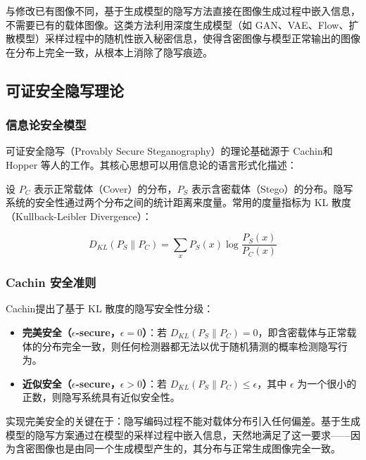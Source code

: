 与修改已有图像不同，基于生成模型的隐写方法直接在图像生成过程中嵌入信息，不需要已有的载体图像。这类方法利用深度生成模型（如 GAN、VAE、Flow、扩散模型）采样过程中的随机性嵌入秘密信息，使得含密图像与模型正常输出的图像在分布上完全一致，从根本上消除了隐写痕迹\supercite{de2022perfectly}。

\subsection{可证安全隐写理论}

\subsubsection{信息论安全模型}

可证安全隐写（Provably Secure Steganography）的理论基础源于 Cachin\supercite{cachin2004information}和 Hopper 等人\supercite{hopper2009provably}的工作。其核心思想可以用信息论的语言形式化描述：

设 $P_C$ 表示正常载体（Cover）的分布，$P_S$ 表示含密载体（Stego）的分布。隐写系统的安全性通过两个分布之间的统计距离来度量。常用的度量指标为 KL 散度（Kullback-Leibler Divergence）：

\begin{equation}\label{eq:kl}
    D_{KL}(P_S \| P_C) = \sum_{x} P_S(x) \log \frac{P_S(x)}{P_C(x)}
\end{equation}

\subsubsection{Cachin 安全准则}

Cachin\supercite{cachin2004information}提出了基于 KL 散度的隐写安全性分级：

\begin{itemize}
    \item \textbf{完美安全（$\epsilon$-secure，$\epsilon=0$）}：若 $D_{KL}(P_S \| P_C) = 0$，即含密载体与正常载体的分布完全一致，则任何检测器都无法以优于随机猜测的概率检测隐写行为。
    \item \textbf{近似安全（$\epsilon$-secure，$\epsilon > 0$）}：若 $D_{KL}(P_S \| P_C) \leq \epsilon$，其中 $\epsilon$ 为一个很小的正数，则隐写系统具有近似安全性。
\end{itemize}

实现完美安全的关键在于：隐写编码过程不能对载体分布引入任何偏差。基于生成模型的隐写方案通过在模型的采样过程中嵌入信息，天然地满足了这一要求——因为含密图像也是由同一个生成模型产生的，其分布与正常生成图像完全一致。

